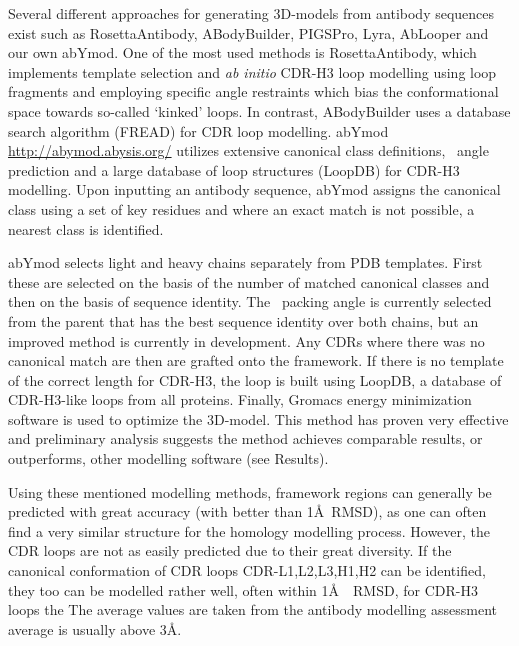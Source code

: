 Several different approaches for generating 
3D-models from antibody sequences exist such as
RosettaAntibody\cite{Sircar2009,Sivasubramanian2009}, 
ABodyBuilder\cite{Leem2016}, PIGSPro\cite{Lepore2017}, Lyra\cite{Klausen2015}, AbLooper\cite{Abanades2022} and our own abYmod.
One of the most
used methods is RosettaAntibody, which implements template selection
and \emph{ab initio} CDR-H3 loop modelling using loop fragments and employing
specific angle restraints which bias the conformational space towards
so-called `kinked' loops\cite{Schoeder2021,Weitzner2017}. In
contrast, ABodyBuilder uses a database search algorithm
(FREAD\cite{Choi2010}) for CDR loop modelling.
abYmod \url{http://abymod.abysis.org/} utilizes extensive canonical
class definitions, \VHVL\ angle prediction and a large database of loop
structures (LoopDB) for CDR-H3 modelling.
Upon inputting an antibody sequence, abYmod assigns the
canonical class using a set of key residues\cite{Martin1996} and where
an exact match is not possible, a nearest class is identified.

abYmod selects light and heavy chains separately from PDB templates.
First these are selected on the basis of the number of matched
canonical classes and then on the basis of sequence identity.  The
\VHVL\ packing angle is currently selected from the parent that has
the best sequence identity over both chains, but an improved method is
currently in development. Any CDRs where there was no canonical match are then
are grafted onto the framework. If there is no template of the correct
length for CDR-H3, the loop is built using LoopDB, a database of
CDR-H3-like loops from all proteins. Finally, Gromacs energy
minimization software is used to optimize the 3D-model. This method has
proven very effective and preliminary analysis suggests the method
achieves comparable results, or outperforms, other modelling software
(see Results).

Using these mentioned modelling methods, framework regions can
generally be predicted with great accuracy (with better than 1\AA\
RMSD\cite{Almagro2014}), as one can often find a very similar
structure for the homology modelling process.  However, the CDR loops
are not as easily predicted due to their great diversity. If the
canonical conformation of CDR loops CDR-L1,L2,L3,H1,H2 can be identified, they too
can be modelled rather well, often within 1\AA\ \ca~RMSD, for CDR-H3 loops
the The average values are taken from the antibody modelling assessment average is usually above 3\AA\cite{Almagro2011}.

